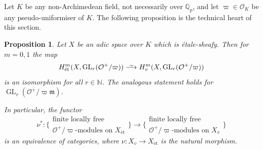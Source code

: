 \documentclass[11pt]{amsart}
\numberwithin{equation}{section}
\newtheorem{Proposition}[thm]{Proposition}
\theoremstyle{definition}
\theoremstyle{remark}
\newcommand{\lra}{\longrightarrow}
\newcommand*{\lowsim}{\vbox to 0pt{\vss\hbox{$\scriptstyle\sim$}\vskip-2pt}}
\newcommand*{\longisomarrow}{\stackrel{\lowsim}{\lra}}
\newcommand{\N}{\mathbb{N}}
\renewcommand{\O}{\mathcal{O}}
\newcommand{\Q}{\mathbb{Q}}
\newcommand{\m}{\mathfrak{m}}
\newcommand{\GL}{\operatorname{GL}}
\newcommand{\et}{{\operatorname{\acute{e}t}}}
\begin{document}
\medskip

Let $K$ be any non-Archimedean field, not necessarily over $\Q_p$, and let $\varpi\in \O_K$ be any pseudo-uniformiser of $K$. The following proposition is the technical heart of this section. 

\begin{Proposition}\label{p:H^1-GL_n-mod-p-agrees-for-et-and-v}
	Let $X$ be an adic space over $K$ which is \'etale-sheafy.  Then for $m=0,1$ the map
	\begin{equation}\label{eq:H^mGL}
	H^m_{\et}(X,\GL_r(\O^+/\varpi))\longisomarrow H^m_{v}(X,\GL_r(\O^+/\varpi))
	\end{equation}
	is an isomorphism for all $r\in \N$. The analogous statement holds for $\GL_r(\O^+/\varpi\m)$.  
	
	In particular, the functor
	\[\nu^{\ast}\colon \Big\{ \begin{array}{c}\text{finite locally free}\\\text{$\O^+/\varpi$-modules on $X_\et$}\end{array}\Big\}\lra \Big\{ \begin{array}{c}\text{finite locally free}\\\text{$\O^+/\varpi$-modules on $X_v$}\end{array}\Big\}\]
	is an equivalence of categories, where $\nu\colon X_v\to X_{\et}$ is the natural morphism.
 \end{Proposition}
\end{document}
